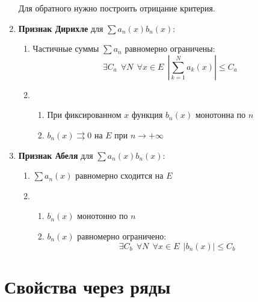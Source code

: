 \begin{enumerate}
          Для обратного нужно построить отрицание критерия.
    \item \textbf{Признак Дирихле} для \(\sum a_n(x)b_n(x)\):
          \begin{enumerate}
              \item Частичные суммы \(\sum a_n\) равномерно ограничены:
                    \[\exists C_a \ \ \forall N \ \ \forall x\in E \ \ \left|\sum_{k = 1}^N a_k(x)\right| \leq C_a\]
              \item \begin{enumerate}
                        \item При фиксированном \(x\) функция \(b_n(x)\) монотонна по \(n\)
                        \item \(b_n(x) \rightrightarrows 0\) на \(E\) при \(n\to +\infty\)
                    \end{enumerate}
          \end{enumerate}
    \item \textbf{Признак Абеля} для \(\sum a_n(x)b_n(x)\):
          \begin{enumerate}
              \item \(\sum a_n(x)\) равномерно сходится на \(E\)
              \item \begin{enumerate}
                        \item \(b_n(x)\) монотонно по \(n\)
                        \item \(b_n(x)\) равномерно ограничено:
                              \[\exists C_b \ \ \forall N \ \ \forall x\in E \ \ |b_n(x)| \leq C_b\]
                    \end{enumerate}
          \end{enumerate}
\end{enumerate}

\section{Свойства через ряды}

